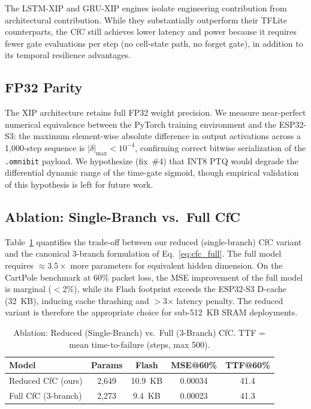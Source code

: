 \documentclass[conference]{IEEEtran}
\begin{document}
The LSTM-XIP and GRU-XIP engines isolate engineering contribution from
architectural contribution. While they substantially outperform their TFLite
counterparts, the CfC still achieves lower latency and power because it
requires fewer gate evaluations per step (no cell-state path, no forget gate),
in addition to its temporal resilience advantages.

\subsection{FP32 Parity}
The XIP architecture retains full FP32 weight precision. We measure
near-perfect numerical equivalence between the PyTorch training environment
and the ESP32-S3: the maximum element-wise absolute difference in output
activations across a 1,000-step sequence is $|\delta|_{\max} < 10^{-4}$,
confirming correct bitwise serialization of the \texttt{.omnibit} payload.
We hypothesize (fix~\#4) that INT8 PTQ would degrade the differential dynamic
range of the time-gate sigmoid, though empirical validation of this hypothesis
is left for future work.

\subsection{Ablation: Single-Branch vs.\ Full CfC}\label{sec:ablation}
Table~\ref{tab:ablation} quantifies the trade-off between our reduced
(single-branch) CfC variant and the canonical 3-branch formulation
of Eq.~\eqref{eq:cfc_full}. The full model requires $\approx3.5\times$ more
parameters for equivalent hidden dimension. On the CartPole benchmark at
60\% packet loss, the MSE improvement of the full model is marginal
($<$2\%), while its Flash footprint exceeds the ESP32-S3 D-cache (32~KB),
inducing cache thrashing and $>$3$\times$ latency penalty. The reduced variant
is therefore the appropriate choice for sub-512~KB SRAM deployments.

\begin{table}[h]
\centering
\caption{Ablation: Reduced (Single-Branch) vs.\ Full (3-Branch) CfC.
         TTF = mean time-to-failure (steps, max 500).}
\label{tab:ablation}
\begin{tabular}{|l|c|c|c|c|}
\hline
\textbf{Model} & \textbf{Params} & \textbf{Flash} & \textbf{MSE@60\%} & \textbf{TTF@60\%} \\ \hline
Reduced CfC (ours) & 2,649 & 10.9~KB & 0.00034 & 41.4 \\ \hline
Full CfC (3-branch) & 2,273 & 9.4~KB & 0.00023 & 41.3 \\ \hline
\end{tabular}
\end{table}
\end{document}
